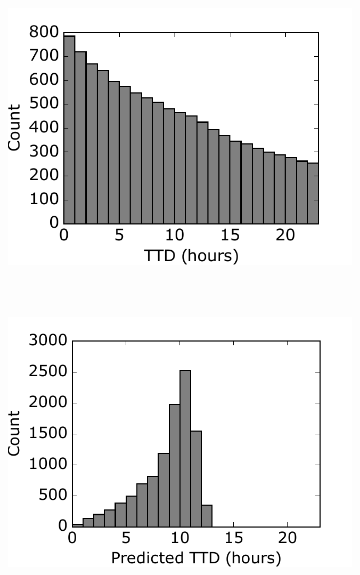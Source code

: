 \documentclass[pdftex,12pt,a4paper]{report}
\begin{document}
\begin{figure}[H]
\centering

\begin{subfigure}{.45\textwidth}
  \centering
  \includegraphics[width=\textwidth]{images/svm/ttd_dist.pdf}
  \caption{}
  \label{fig:svm_ttd_dist}
\end{subfigure}
~
\begin{subfigure}{.45\textwidth}
  \centering
  \includegraphics[width=\textwidth]{images/svm/pred_ttd_dist.pdf}
  \caption{}
  \label{fig:pred_ttd_dist}
\end{subfigure}

\centering


\end{figure}
\end{document}
